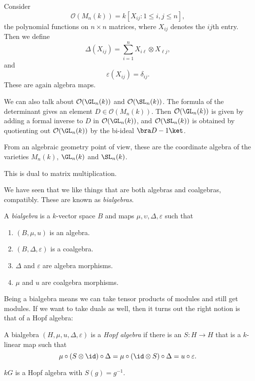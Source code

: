 \documentclass[a4paper]{article}
\begin{document}
\begin{eg}
  Consider
  \[
    \mathcal{O}(M_n(k)) = k[X_{ij}: 1 \leq i, j\leq n],
  \]
  the polynomial functions on $n \times n$ matrices, where $X_{ij}$ denotes the $ij$th entry. Then we define
  \[
    \Delta (X_{ij}) = \sum_{i = 1}^n X_{i\ell} \otimes X_{\ell j},
  \]
  and
  \[
    \varepsilon(X_{ij}) = \delta_{ij}.
  \]
  These are again algebra maps.

  We can also talk about $\mathcal{O}(\GL_n(k))$ and $\mathcal{O}(\SL_n(k))$. The formula of the determinant gives an element $D \in \mathcal{O}(M_n(k))$. Then $\mathcal{O}(\GL_n(k))$ is given by adding a formal inverse to $D$ in $\mathcal{O}(\GL_n(k))$, and $\mathcal{O}(\SL_n(k))$ is obtained by quotienting out $\mathcal{O}(\GL_n(k))$ by the bi-ideal $\bra D - 1\ket$.

  From an algebraic geometry point of view, these are the coordinate algebra of the varieties $M_n(k)$, $\GL_n(k)$ and $\SL_n(k)$.
\end{eg}
This is dual to matrix multiplication.

We have seen that we like things that are both algebras and coalgebras, compatibly.  These are known as \emph{bialgebras}.
\begin{defi}[Bialgebra]
  A \emph{bialgebra} is a $k$-vector space $B$ and maps $\mu, \upsilon, \Delta, \varepsilon$ such that
  \begin{enumerate}
    \item $(B, \mu, u)$ is an algebra.
    \item $(B, \Delta, \varepsilon)$ is a coalgebra.
    \item $\Delta$ and $\varepsilon$ are algebra morphisms.
    \item $\mu$ and $u$ are coalgebra morphisms.
  \end{enumerate}
\end{defi}
Being a bialgebra means we can take tensor products of modules and still get modules. If we want to take duals as well, then it turns out the right notion is that of a Hopf algebra:
\begin{defi}
  A bialgebra $(H, \mu, u, \Delta, \varepsilon)$ is a \emph{Hopf algebra} if there is an  $S: H \to H$ that is a $k$-linear map such that
  \[
    \mu \circ (S \otimes \id) \circ \Delta = \mu \circ (\id \otimes S) \circ \Delta = u \circ \varepsilon.
  \]
\end{defi}

\begin{eg}
  $kG$ is a Hopf algebra with $S(g) = g^{-1}$.
\end{eg}
\end{document}

